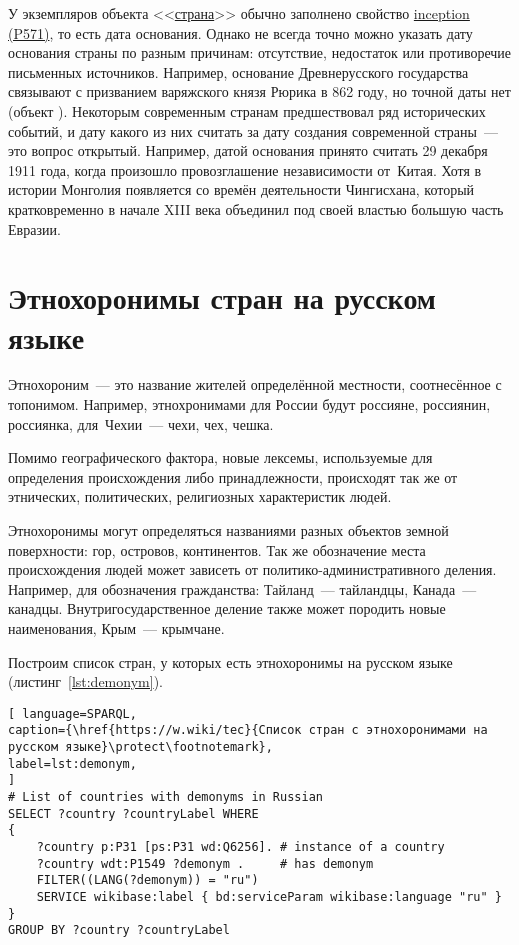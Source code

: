     У экземпляров объекта <<\href{https://www.wikidata.org/wiki/Q6256}{страна}>> обычно заполнено свойство \href{https://www.wikidata.org/wiki/Property:P571}{inception (P571)}, то есть дата основания. Однако не всегда точно можно  указать дату основания страны по разным причинам: отсутствие, недостаток или противоречие письменных источников. Например, основание Древнерусского государства связывают с призванием варяжского князя Рюрика в 862 году, но точной даты нет (объект ). 
Некоторым современным странам предшествовал ряд исторических событий, 
и дату какого из них считать за дату создания современной страны~--- это вопрос открытый. 
Например, датой основания  принято считать 29 декабря 1911 года, 
когда произошло провозглашение независимости от~Китая. 
Хотя в истории Монголия появляется со времён деятельности Чингисхана, 
который кратковременно в начале XIII 
века объединил под своей властью большую часть Евразии.



\section{Этнохоронимы стран на русском языке}

Этнохороним~--- это название жителей определённой местности, соотнесённое с топонимом. 
Например, этнохронимами для России будут россияне, россиянин, россиянка, 
для~Чехии~--- чехи, чех, чешка.

Помимо географического фактора, новые лексемы, используемые для определения происхождения либо принадлежности, происходят так же от этнических, политических, религиозных характеристик людей\autocite{Zhuravleva2012}. 

Этнохоронимы могут определяться названиями разных объектов земной поверхности: гор, островов, континентов. Так же обозначение места происхождения людей может зависеть от политико-административного деления. Например, для обозначения гражданства: Тайланд~--- тайландцы, Канада~--- канадцы. Внутригосударственное деление также может породить новые наименования, Крым~--- крымчане.



\newpage
Построим список стран, у которых есть этнохоронимы на русском языке (листинг~\ref{lst:demonym}).


\begin{lstlisting}[ language=SPARQL, 
caption={\href{https://w.wiki/tec}{Список стран с этнохоронимами на русском языке}\protect\footnotemark},
label=lst:demonym, 
]
# List of countries with demonyms in Russian
SELECT ?country ?countryLabel WHERE
{
	?country p:P31 [ps:P31 wd:Q6256]. # instance of a country
	?country wdt:P1549 ?demonym .     # has demonym
	FILTER((LANG(?demonym)) = "ru")
	SERVICE wikibase:label { bd:serviceParam wikibase:language "ru" }
}
GROUP BY ?country ?countryLabel
\end{lstlisting}





